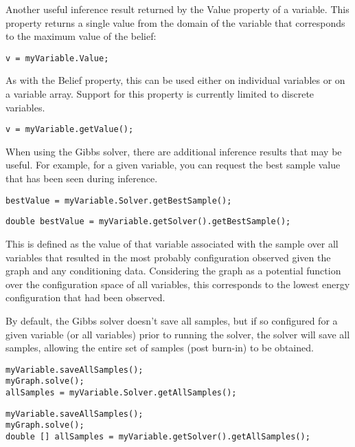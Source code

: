 Another useful inference result returned by the Value property of a variable.  This property returns a single value from the domain of the variable that corresponds to the maximum value of the belief:

\ifmatlab
\begin{lstlisting}
v = myVariable.Value;
\end{lstlisting}

As with the Belief property, this can be used either on individual variables or on a variable array.  Support for this property is currently limited to discrete variables.

\fi

\ifjava
\begin{lstlisting}
v = myVariable.getValue();
\end{lstlisting}
\fi

When using the Gibbs solver, there are additional inference results that may be useful.  For example, for a given variable, you can request the best sample value that has been seen during inference.

\ifmatlab
\begin{lstlisting}
bestValue = myVariable.Solver.getBestSample();
\end{lstlisting}
\fi

\ifjava
\begin{lstlisting}
double bestValue = myVariable.getSolver().getBestSample();
\end{lstlisting}
\fi

This is defined as the value of that variable associated with the sample over all variables that resulted in the most probably configuration observed given the graph and any conditioning data. Considering the graph as a potential function over the configuration space of all variables, this corresponds to the lowest energy configuration that had been observed.

By default, the Gibbs solver doesn't save all samples, but if so configured for a given variable (or all variables) prior to running the solver, the solver will save all samples, allowing the entire set of samples (post burn-in) to be obtained.

\ifmatlab
\begin{lstlisting}
myVariable.saveAllSamples();
myGraph.solve();
allSamples = myVariable.Solver.getAllSamples();
\end{lstlisting}
\fi

\ifjava
\begin{lstlisting}
myVariable.saveAllSamples();
myGraph.solve();
double [] allSamples = myVariable.getSolver().getAllSamples();
\end{lstlisting}
\fi

